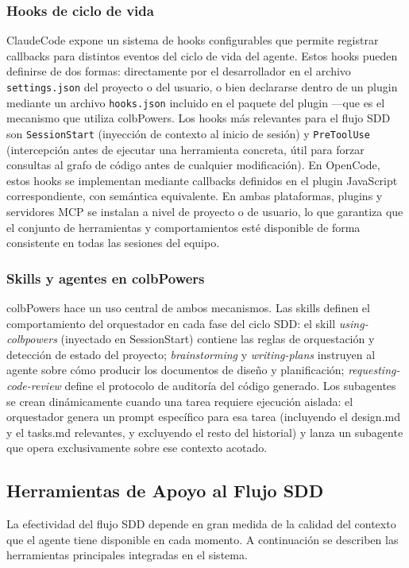 \documentclass[11pt, letterpaper]{article}
\begin{document}
\subsubsection{Hooks de ciclo de vida}
\label{sec:hooks_ciclo_vida}
ClaudeCode expone un sistema de hooks configurables que permite registrar callbacks para distintos eventos del ciclo de vida del agente. Estos hooks pueden definirse de dos formas: directamente por el desarrollador en el archivo \texttt{settings.json} del proyecto o del usuario, o bien declararse dentro de un plugin mediante un archivo \texttt{hooks.json} incluido en el paquete del plugin ---que es el mecanismo que utiliza colbPowers. Los hooks más relevantes para el flujo SDD son \texttt{SessionStart} (inyección de contexto al inicio de sesión) y \texttt{PreToolUse} (intercepción antes de ejecutar una herramienta concreta, útil para forzar consultas al grafo de código antes de cualquier modificación). En OpenCode, estos hooks se implementan mediante callbacks definidos en el plugin JavaScript correspondiente, con semántica equivalente. En ambas plataformas, plugins y servidores MCP se instalan a nivel de proyecto o de usuario, lo que garantiza que el conjunto de herramientas y comportamientos esté disponible de forma consistente en todas las sesiones del equipo.

\subsubsection{Skills y agentes en colbPowers}
\label{sec:skills_agentes_colbpowers}
colbPowers hace un uso central de ambos mecanismos. Las skills definen el comportamiento del orquestador en cada fase del ciclo SDD: el skill \textit{using-colbpowers} (inyectado en SessionStart) contiene las reglas de orquestación y detección de estado del proyecto; \textit{brainstorming} y \textit{writing-plans} instruyen al agente sobre cómo producir los documentos de diseño y planificación; \textit{requesting-code-review} define el protocolo de auditoría del código generado. Los subagentes se crean dinámicamente cuando una tarea requiere ejecución aislada: el orquestador genera un prompt específico para esa tarea (incluyendo el design.md y el tasks.md relevantes, y excluyendo el resto del historial) y lanza un subagente que opera exclusivamente sobre ese contexto acotado.

\subsection{Herramientas de Apoyo al Flujo SDD}
\label{sec:herramientas_apoyo_sdd}
La efectividad del flujo SDD depende en gran medida de la calidad del contexto que el agente tiene disponible en cada momento. A continuación se describen las herramientas principales integradas en el sistema.
\end{document}
